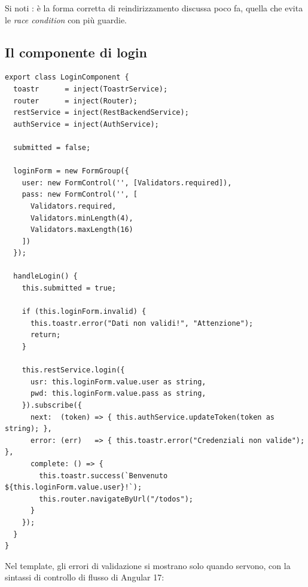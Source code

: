 Si noti : è la forma corretta di reindirizzamento
discussa poco fa, quella che evita le \textit{race condition} con più guardie.

\subsection{Il componente di login}

\begin{lstlisting}[style=ts, name=login.component.ts]
export class LoginComponent {
  toastr      = inject(ToastrService);
  router      = inject(Router);
  restService = inject(RestBackendService);
  authService = inject(AuthService);

  submitted = false;

  loginForm = new FormGroup({
    user: new FormControl('', [Validators.required]),
    pass: new FormControl('', [
      Validators.required,
      Validators.minLength(4),
      Validators.maxLength(16)
    ])
  });

  handleLogin() {
    this.submitted = true;

    if (this.loginForm.invalid) {
      this.toastr.error("Dati non validi!", "Attenzione");
      return;
    }

    this.restService.login({
      usr: this.loginForm.value.user as string,
      pwd: this.loginForm.value.pass as string,
    }).subscribe({
      next:  (token) => { this.authService.updateToken(token as string); },
      error: (err)   => { this.toastr.error("Credenziali non valide"); },
      complete: () => {
        this.toastr.success(`Benvenuto ${this.loginForm.value.user}!`);
        this.router.navigateByUrl("/todos");
      }
    });
  }
}
\end{lstlisting}

Nel template, gli errori di validazione si mostrano solo quando servono, con la
sintassi di controllo di flusso di Angular 17:

